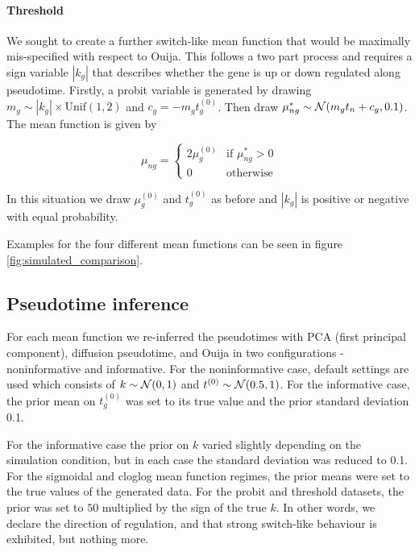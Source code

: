 \paragraph{Threshold}

We sought to create a further switch-like mean function that would be maximally mis-specified with respect to Ouija. This follows a two part process and requires a sign variable $|k_g|$ that describes whether the gene is up or down regulated along pseudotime. Firstly, a probit variable is generated by drawing $m_g \sim |k_g| \times \text{Unif}(1,2)$ and $c_g = -m_g t^{(0)}_g$. Then draw $\mu^*_{ng} \sim \mathcal{N}(m_g t_n + c_g, 0.1)$. The mean function is given by

\begin{equation}
    \mu_{ng} = 
    \begin{cases}
        2 \mu_g^{(0)} & \text{if } \mu^*_{ng} > 0 \\
        0 & \text{otherwise}
    \end{cases}
\end{equation}

In this situation we draw $ \mu_g^{(0)}$ and $t^{(0)}_{g}$ as before and $|k_g|$ is positive or negative with equal probability.

Examples for the four different mean functions can be seen in figure \ref{fig:simulated_comparison}.

\subsection{Pseudotime inference}

For each mean function we re-inferred the pseudotimes with PCA (first principal component), diffusion pseudotime, and Ouija in two configurations - noninformative and informative. For the noninformative case, default settings are used which consists of $k \sim \mathcal{N}(0, 1)$ and $t^{(0)} \sim \mathcal{N}(0.5, 1)$. For the informative case, the prior mean on $t^{(0)}_{g}$ was set to its true value and the prior standard deviation 0.1.

For the informative case the prior on $k$ varied slightly depending on the simulation condition, but in each case the standard deviation was reduced to 0.1. For the sigmoidal and cloglog mean function regimes, the prior means were set to the true values of the generated data. For the probit and threshold datasets, the prior was set to $50$ multiplied by the sign of the true $k$. In other words, we declare the direction of regulation, and that strong switch-like behaviour is exhibited, but nothing more.

